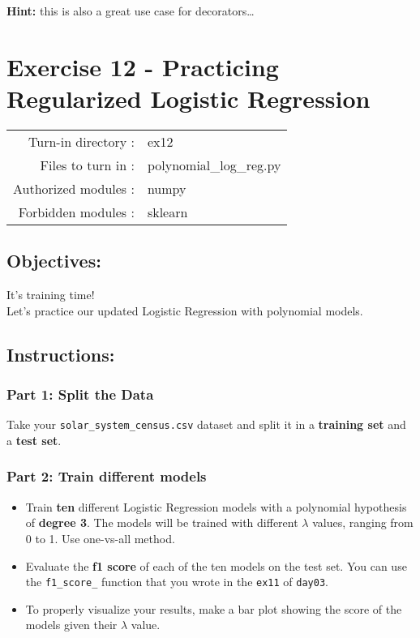 \documentclass[]{article}
\begin{document}
\textbf{Hint:} this is also a great use case for decorators\ldots{}

\clearpage

\hypertarget{exercise-12---practicing-regularized-logistic-regression-1}{%
\section{Exercise 12 - Practicing Regularized Logistic
Regression}\label{exercise-12---practicing-regularized-logistic-regression-1}}

\begin{longtable}[]{@{}rl@{}}
\toprule
\endhead
Turn-in directory : & ex12\tabularnewline
Files to turn in : & polynomial\_log\_reg.py\tabularnewline
Authorized modules : & numpy\tabularnewline
Forbidden modules : & sklearn\tabularnewline
\bottomrule
\end{longtable}

\hypertarget{objectives-11}{%
\subsection{Objectives:}\label{objectives-11}}

It's training time!\\
Let's practice our updated Logistic Regression with polynomial models.

\hypertarget{instructions-11}{%
\subsection{Instructions:}\label{instructions-11}}

\hypertarget{part-1-split-the-data}{%
\subsubsection{Part 1: Split the Data}\label{part-1-split-the-data}}

Take your \texttt{solar\_system\_census.csv} dataset and split it in a
\textbf{training set} and a \textbf{test set}.

\hypertarget{part-2-train-different-models}{%
\subsubsection{Part 2: Train different
models}\label{part-2-train-different-models}}

\begin{itemize}
\item
  Train \textbf{ten} different Logistic Regression models with a
  polynomial hypothesis of \textbf{degree 3}. The models will be trained
  with different \(\lambda\) values, ranging from 0 to 1. Use one-vs-all
  method.
\item
  Evaluate the \textbf{f1 score} of each of the ten models on the test
  set. You can use the \texttt{f1\_score\_} function that you wrote in
  the \texttt{ex11} of \texttt{day03}.
\item
  To properly visualize your results, make a bar plot showing the score
  of the models given their \(\lambda\) value.
\end{itemize}
\end{document}
